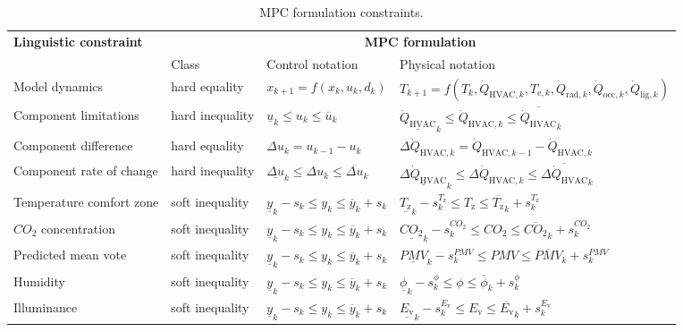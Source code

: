 \documentclass[10pt]{extarticle}
\begin{document}
\renewcommand{\arraystretch}{2.5}
\begin{table}[ht]
	\centering
	\caption{MPC formulation constraints.}
	\label{tab:mpc_form:constraints}
	\begin{adjustwidth}{-1cm}{}
	\begin{tabular}{l|lll}
		\toprule
		\textbf{Linguistic constraint}  &  \multicolumn{3}{c}{\textbf{MPC formulation}} \\
		& Class &  Control notation &  Physical notation \\
		\midrule
		Model dynamics & hard equality & $ x_{k+1} = f(x_k,u_k,d_k) $  & $ T_{k+1} = f(T_k,\dot{Q}_{\text{HVAC},k},T_{\text{e},k},\dot{Q}_{\text{rad},k},\dot{Q}_{\text{occ},k},\dot{Q}_{\text{lig},k}) $ \\ 
		Component limitations & hard inequality & $ \underline{u}_k \le u_k \le \overline{u}_k  $  & $ \underline{\dot{Q}_{\text{HVAC}}}_k  \le \dot{Q}_{\text{HVAC},k}  \le \overline{\dot{Q}_{\text{HVAC}}}_k  $ \\ 
		Component difference & hard equality & $\Delta u_k = u_{k-1} - u_k $  & $\Delta \dot{Q}_{\text{HVAC},k} = \dot{Q}_{\text{HVAC},k-1} - \dot{Q}_{\text{HVAC},k} $  \\ 
		Component rate of change & hard inequality & $ \underline{\Delta u}_k   \le \Delta u_k  \le \overline{\Delta u}_k  $ & $ \underline{\Delta \dot{Q}_{\text{HVAC}}}_k   \le \Delta \dot{Q}_{\text{HVAC},k}  \le \overline{\Delta \dot{Q}_{\text{HVAC}}}_k  $ \\ 
		Temperature comfort zone & soft inequality & $ \underline{y}_k - s_k \le y_k \le \overline{y}_k + s_k $  & $ \underline{T_{\text{z}}}_k - s^{T_{\text{z}}}_{k} \le T_{\text{z}} \le \overline{T_{\text{z}}}_k + s^{T_{\text{z}}}_{k} $ \\
		$CO_2$ concentration & soft inequality & $ \underline{y}_k - s_k \le y_k \le \overline{y}_k + s_k $ & $ \underline{{CO_2}}_k - s^{CO_2}_k \le CO_2 \le \overline{{CO_2}}_k + s^{CO_2}_k $  \\
		Predicted mean vote &  soft inequality & $ \underline{y}_k - s_k \le y_k \le \overline{y}_k + s_k $ & $ \underline{PMV}_k - s^{PMV}_k \le PMV \le \overline{PMV}_k + s^{PMV}_k $  \\
		Humidity & soft inequality & $ \underline{y}_k - s_k \le y_k \le \overline{y}_k + s_k $ & $ \underline{\phi}_k - s^{\phi}_k \le \phi \le \overline{\phi}_k + s^{\phi}_k $  \\
		Illuminance & soft inequality & $ \underline{y}_k - s_k \le y_k \le \overline{y}_k + s_k $ & $ \underline{{E_\text{v}}}_k - s^{E_\text{v}}_k \le E_\text{v} \le \overline{{E_\text{v}}}_k + s^{E_\text{v}}_k $  \\
		\bottomrule 
	\end{tabular}
	\end{adjustwidth}
\end{table}
\end{document}
